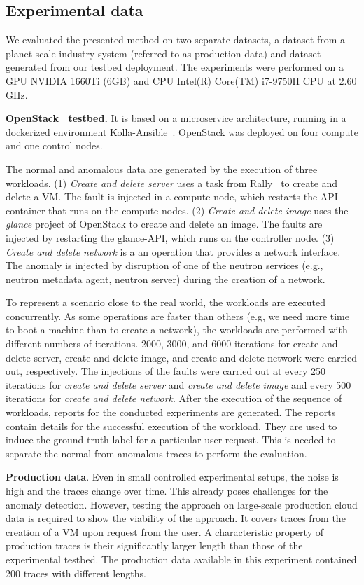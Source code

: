 \subsection{Experimental data}
We evaluated the presented method on two separate datasets, a dataset from a planet-scale industry system (referred to as production data) and dataset generated from our testbed deployment. The experiments were performed on a GPU NVIDIA 1660Ti (6GB) and CPU Intel(R) Core(TM) i7-9750H CPU at 2.60 GHz.

\textbf{OpenStack~\cite{ShrivastwaOpenstack} testbed.} It is based on a microservice architecture, running in a dockerized environment Kolla-Ansible~\cite{kollaansible}. OpenStack was deployed on four compute and one control nodes. 

The normal and anomalous data are generated by the execution of three workloads. (1) \textit{Create and delete server} uses a task from Rally~\cite{rally} to create and delete a VM. The fault is injected in a compute node, which restarts the API container that runs on the compute nodes. (2) \textit{Create and delete image} uses the \textit{glance} project of OpenStack to create and delete an image. The faults are injected by restarting the glance-API, which runs on the controller node. (3) \textit{Create and delete network} is a an operation that provides a network interface. The anomaly is injected by disruption of one of the neutron services (e.g., neutron metadata agent, neutron server) during the creation of a network.

To represent a scenario close to the real world, the workloads are executed concurrently. As some operations are faster than others (e.g, we need more time to boot a machine than to create a network), the workloads are performed with different numbers of iterations. 2000, 3000, and 6000 iterations for create and delete server, create and delete image, and create and delete network were carried out, respectively. The injections of the faults were carried out at every 250 iterations for \textit{create and delete server} and \textit{create and delete image} and every 500 iterations for \textit{create and delete network}. After the execution of the sequence of workloads, reports for the conducted experiments are generated. The reports contain details for the successful execution of the workload. They are used to induce the ground truth label for a particular user request. This is needed to separate the normal from anomalous traces to perform the evaluation.

\textbf{Production data}. Even in small controlled experimental setups, the noise is high and the traces change over time. This already poses challenges for the anomaly detection. However, testing the approach on large-scale production cloud data is required to show the viability of the approach. It covers traces from the creation of a VM upon request from the user. A characteristic property of production traces is their significantly larger length than those of the experimental testbed. The production data available in this experiment contained 200 traces with different lengths. 

